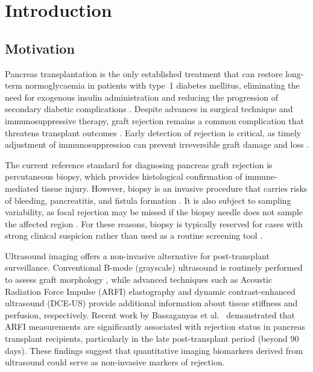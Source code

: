 \normallinespacing

\chapter{Introduction}

\section{Motivation}

Pancreas transplantation is the only established treatment that can restore long-term normoglycaemia in patients with type~1 diabetes mellitus, eliminating the need for exogenous insulin administration and reducing the progression of secondary diabetic complications \cite{gruessner2016, white2009}. Despite advances in surgical technique and immunosuppressive therapy, graft rejection remains a common complication that threatens transplant outcomes \cite{niederhaus2013}. Early detection of rejection is critical, as timely adjustment of immunosuppression can prevent irreversible graft damage and loss \cite{redfield2015}.

The current reference standard for diagnosing pancreas graft rejection is percutaneous biopsy, which provides histological confirmation of immune-mediated tissue injury. However, biopsy is an invasive procedure that carries risks of bleeding, pancreatitis, and fistula formation \cite{klassen2002, singh2024}. It is also subject to sampling variability, as focal rejection may be missed if the biopsy needle does not sample the affected region \cite{drachenberg2008}. For these reasons, biopsy is typically reserved for cases with strong clinical suspicion rather than used as a routine screening tool \cite{singh2024}.

Ultrasound imaging offers a non-invasive alternative for post-transplant surveillance. Conventional B-mode (grayscale) ultrasound is routinely performed to assess graft morphology \cite{monelli2019}, while advanced techniques such as Acoustic Radiation Force Impulse (ARFI) elastography and dynamic contrast-enhanced ultrasound (DCE-US) provide additional information about tissue stiffness and perfusion, respectively. Recent work by Bassaganyas et al.\ \cite{bassaganyas2025} demonstrated that ARFI measurements are significantly associated with rejection status in pancreas transplant recipients, particularly in the late post-transplant period (beyond 90 days). These findings suggest that quantitative imaging biomarkers derived from ultrasound could serve as non-invasive markers of rejection.

